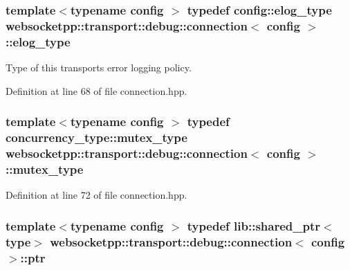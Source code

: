 \subsubsection[{elog\+\_\+type}]{\setlength{\rightskip}{0pt plus 5cm}template$<$typename config $>$ typedef config\+::elog\+\_\+type {\bf websocketpp\+::transport\+::debug\+::connection}$<$ config $>$\+::{\bf elog\+\_\+type}}\label{classwebsocketpp_1_1transport_1_1debug_1_1connection_a38501811c59ca185f0dde7fa7fa8486f}


Type of this transport\textquotesingle{}s error logging policy. 



Definition at line 68 of file connection.\+hpp.

\hypertarget{classwebsocketpp_1_1transport_1_1debug_1_1connection_a3883614ff681edac3ee6556462636103}{}
\subsubsection[{mutex\+\_\+type}]{\setlength{\rightskip}{0pt plus 5cm}template$<$typename config $>$ typedef concurrency\+\_\+type\+::mutex\+\_\+type {\bf websocketpp\+::transport\+::debug\+::connection}$<$ config $>$\+::{\bf mutex\+\_\+type}}\label{classwebsocketpp_1_1transport_1_1debug_1_1connection_a3883614ff681edac3ee6556462636103}


Definition at line 72 of file connection.\+hpp.

\hypertarget{classwebsocketpp_1_1transport_1_1debug_1_1connection_a40631f93557c3308c2c8c7897e6a4825}{}
\subsubsection[{ptr}]{\setlength{\rightskip}{0pt plus 5cm}template$<$typename config $>$ typedef lib\+::shared\+\_\+ptr$<${\bf type}$>$ {\bf websocketpp\+::transport\+::debug\+::connection}$<$ config $>$\+::{\bf ptr}}\label{classwebsocketpp_1_1transport_1_1debug_1_1connection_a40631f93557c3308c2c8c7897e6a4825}


